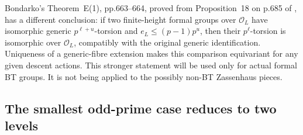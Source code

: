 \begin{remark}\label{auto:B:cb3f24f10664}

Bondarko's Theorem~E(1), pp.663--664, proved from Proposition~18
on p.685 of \cite{Bondarko2006Generic}, has a different conclusion:
if two finite-height formal groups over $\mathcal O_L$ have
isomorphic generic $p^{\ell+u}$-torsion and
$e_L\leq(p-1)p^u$, then their $p^\ell$-torsion is isomorphic over
$\mathcal O_L$, compatibly with the original generic
identification. Uniqueness of a generic-fibre extension makes this
comparison equivariant for any given descent actions. This
stronger statement will be used only for actual formal BT groups.
It is not being applied to the possibly non-BT Zassenhaus pieces.
\end{remark}


\subsection{The smallest odd-prime case reduces to two levels}

